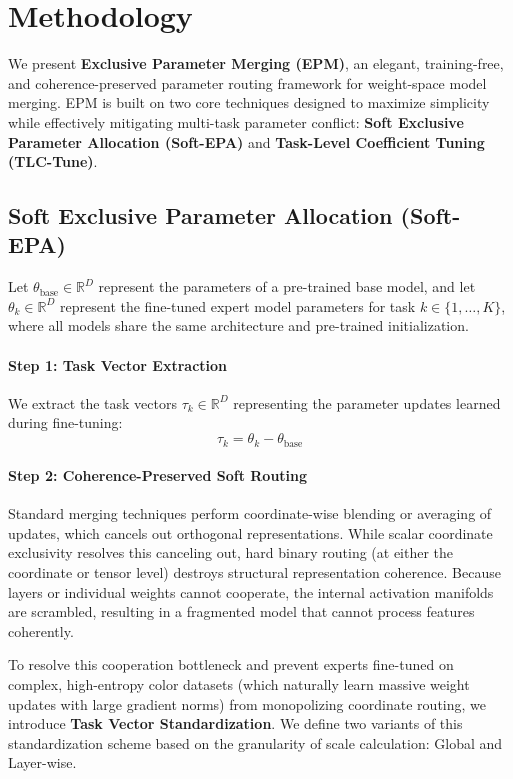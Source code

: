 \section{Methodology}
\label{submission:method}

We present \textbf{Exclusive Parameter Merging (EPM)}, an elegant, training-free, and coherence-preserved parameter routing framework for weight-space model merging. EPM is built on two core techniques designed to maximize simplicity while effectively mitigating multi-task parameter conflict: \textbf{Soft Exclusive Parameter Allocation (Soft-EPA)} and \textbf{Task-Level Coefficient Tuning (TLC-Tune)}.

\subsection{Soft Exclusive Parameter Allocation (Soft-EPA)}
Let $\theta_{\text{base}} \in \mathbb{R}^D$ represent the parameters of a pre-trained base model, and let $\theta_k \in \mathbb{R}^D$ represent the fine-tuned expert model parameters for task $k \in \{1, \dots, K\}$, where all models share the same architecture and pre-trained initialization.

\paragraph{Step 1: Task Vector Extraction}
We extract the task vectors $\tau_k \in \mathbb{R}^D$ representing the parameter updates learned during fine-tuning:
\begin{equation}
\label{eq:task_vector}
\tau_k = \theta_k - \theta_{\text{base}}
\end{equation}

\paragraph{Step 2: Coherence-Preserved Soft Routing}
Standard merging techniques perform coordinate-wise blending or averaging of updates, which cancels out orthogonal representations. While scalar coordinate exclusivity resolves this canceling out, hard binary routing (at either the coordinate or tensor level) destroys structural representation coherence. Because layers or individual weights cannot cooperate, the internal activation manifolds are scrambled, resulting in a fragmented model that cannot process features coherently.

To resolve this cooperation bottleneck and prevent experts fine-tuned on complex, high-entropy color datasets (which naturally learn massive weight updates with large gradient norms) from monopolizing coordinate routing, we introduce \textbf{Task Vector Standardization}. We define two variants of this standardization scheme based on the granularity of scale calculation: Global and Layer-wise.

